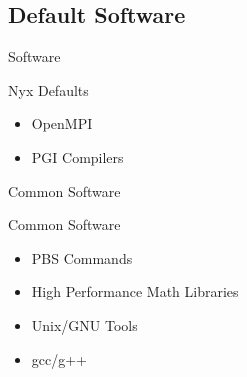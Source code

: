 \documentclass[handout]{beamer}
\begin{document}
  \subsection {Default Software}
  \begin{frame}{Software}
    \begin{block}{Nyx Defaults}
    \begin{itemize}
      \item OpenMPI
      \item PGI Compilers
    \end{itemize}
    \end{block}
  \end{frame}

  \begin{frame}{Common Software}
   \begin{block}{Common Software}
    \begin{itemize}
     \item PBS Commands
     \item High Performance Math Libraries
     \item Unix/GNU Tools
     \item gcc/g++
    \end{itemize}
   \end{block}
  \end{frame}
\end{document}
